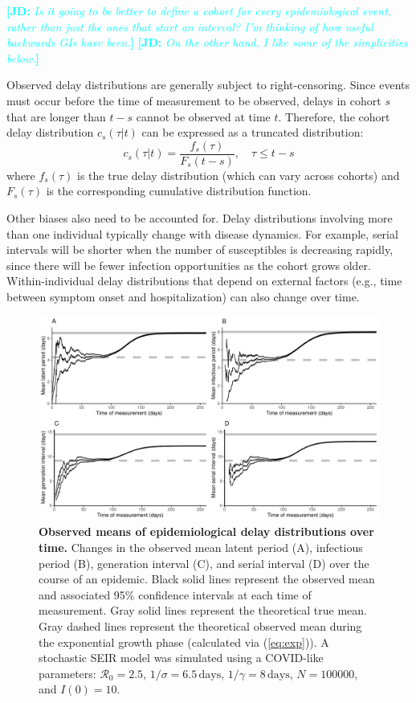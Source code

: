 \documentclass[12pt]{article}
\newcommand{\eref}[1]{(\ref{eq:#1})}
\newcommand{\comment}[3]{\textcolor{#1}{\textbf{[#2: }\textsl{#3}\textbf{]}}}
\newcommand{\jd}[1]{\comment{cyan}{JD}{#1}}
\begin{document}
\jd{Is it going to be better to define a cohort for every epidemiological event, rather than just the ones that \emph{start} an interval? I'm thinking of how useful backwards GIs have been.}
\jd{On the other hand, I like some of the simplicities below.}

Observed delay distributions are generally subject to right-censoring.
Since events must occur before the time of measurement to be observed, delays in cohort $s$ that are longer than $t-s$ cannot be observed at time $t$.
Therefore, the cohort delay distribution $c_s(\tau|t)$ can be expressed as a truncated distribution:
\begin{equation}
c_s(\tau|t) = \frac{f_s(\tau)}{F_s(t-s)},\quad \tau \leq t-s
\end{equation}
where $f_s(\tau)$ is the true delay distribution (which can vary across cohorts) and $F_s(\tau)$ is the corresponding cumulative distribution function.

Other biases also need to be accounted for. Delay distributions involving more than one individual typically change with disease dynamics. For example, serial intervals will be shorter when the number of susceptibles is decreasing rapidly, since there will be fewer infection opportunities as the cohort grows older.
Within-individual delay distributions that depend on external factors (e.g., time between symptom onset and hospitalization) can also change over time.

\begin{figure}[!th]
\includegraphics[width=\textwidth]{figure_seir.pdf}
\caption{
\textbf{Observed means of epidemiological delay distributions over time.}
Changes in the observed mean latent period (A), infectious period (B), generation interval (C), and serial interval (D) over the course of an epidemic.
Black solid lines represent the observed mean and associated 95\% confidence intervals at each time of measurement.
Gray solid lines represent the theoretical true mean.
Gray dashed lines represent the theoretical observed mean during the exponential growth phase (calculated via \eref{exp}).
A stochastic SEIR model was simulated using a COVID-like parameters: $\mathcal R_0 = 2.5$, $1/\sigma = 6.5\,\textrm{days}$, $1/\gamma = 8\,\textrm{days}$, $N=100000$, and $I(0)=10$.
}
\label{fig:seir}
\end{figure}
\end{document}
